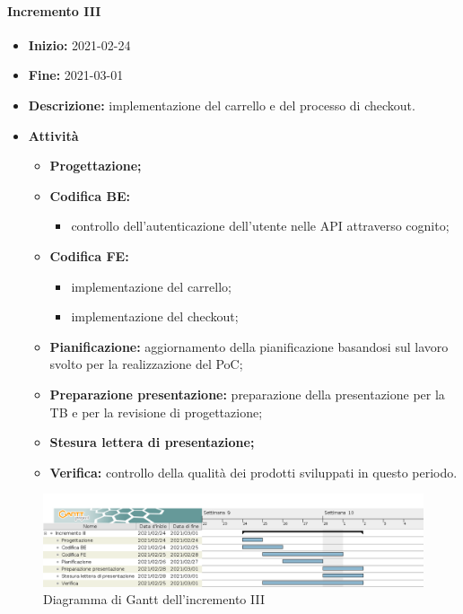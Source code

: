 \paragraph[Incremento III]{Incremento III}
\begin{itemize}
    \item [] \textbf{Inizio:} 2021-02-24
    \item [] \textbf{Fine:} 2021-03-01
    \item [] \textbf{Descrizione:} implementazione del carrello e del processo di checkout.
    \item [] \textbf{Attività}
          \begin{itemize}
              \item \textbf{Progettazione;}
              \item \textbf{Codifica BE:}
                    \begin{itemize}
                        \item controllo dell'autenticazione dell'utente nelle API attraverso cognito;
                    \end{itemize}
              \item \textbf{Codifica FE:}
                    \begin{itemize}
                        \item implementazione del carrello;
                        \item implementazione del checkout;
                    \end{itemize}
              \item \textbf{Pianificazione:} aggiornamento della pianificazione basandosi sul lavoro svolto per la realizzazione del PoC;
              \item \textbf{Preparazione presentazione:} preparazione della presentazione per la TB e per la revisione di progettazione;
              \item \textbf{Stesura lettera di presentazione;}
              \item \textbf{Verifica:} controllo della qualità dei prodotti sviluppati in questo periodo.
          \end{itemize}
\end{itemize}

\begin{figure}[H]
    \centering
    \includegraphics[width=1\linewidth]{res/images/pianificazione/incremento_3.png}
    \caption{Diagramma di Gantt dell'incremento III}
    \label{fig:_Gantt incremento III}
\end{figure}

